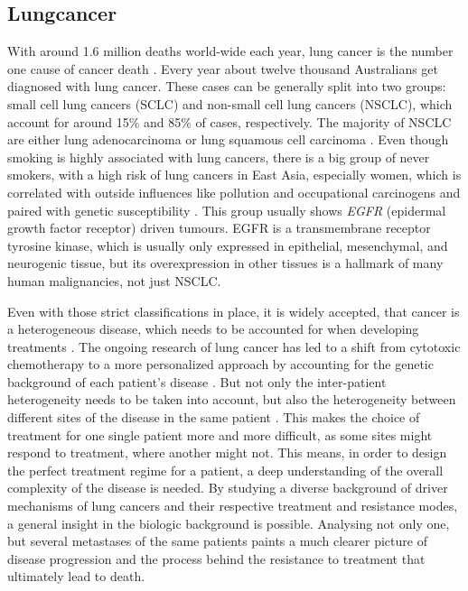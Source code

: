 \subsection{Lungcancer}
\label{intro-sec:lungcancer}

With around 1.6 million deaths world-wide each year, lung cancer is the number one cause of cancer death \cite{Siegel2018}. Every year about twelve thousand Australians get diagnosed with lung cancer. These cases can be generally split into two groups: small cell lung cancers (SCLC) and non-small cell lung cancers (NSCLC), which account for around 15\% and 85\% of cases, respectively. The majority of NSCLC are either lung adenocarcinoma or lung squamous cell carcinoma \cite{Molina2008}. Even though smoking is highly associated with lung cancers, there is a big group of never smokers, with a high risk of lung cancers in East Asia, especially women, which is correlated with outside influences like pollution and occupational carcinogens and paired with genetic susceptibility \cite{Sun2007}.
This group usually shows \textit{EGFR} (epidermal growth factor receptor) driven tumours. EGFR is a transmembrane receptor tyrosine kinase, which is usually only expressed in epithelial, mesenchymal, and neurogenic tissue, but its overexpression in other tissues is a hallmark of many human malignancies, not just NSCLC.

Even with those strict classifications in place, it is widely accepted, that cancer is a heterogeneous disease, which needs to be accounted for when developing treatments \cite{Suda2018}. The ongoing research of lung cancer has led to a shift from cytotoxic chemotherapy to a more personalized approach by accounting for the genetic background of each patient’s disease \cite{Lindeman2018}. 
But not only the inter-patient heterogeneity needs to be taken into account, but also the heterogeneity between different sites of the disease in the same patient \cite{Leong2018,Savas2016}. This makes the choice of treatment for one single patient more and more difficult, as some sites might respond to treatment, where another might not. This means, in order to design the perfect treatment regime for a patient, a deep understanding of the overall complexity of the disease is needed. By studying a diverse background of driver mechanisms of lung cancers and their respective treatment and resistance modes, a general insight in the biologic background is possible. Analysing not only one, but several metastases of the same patients paints a much clearer picture of disease progression and the process behind the resistance to treatment that ultimately lead to death. 


